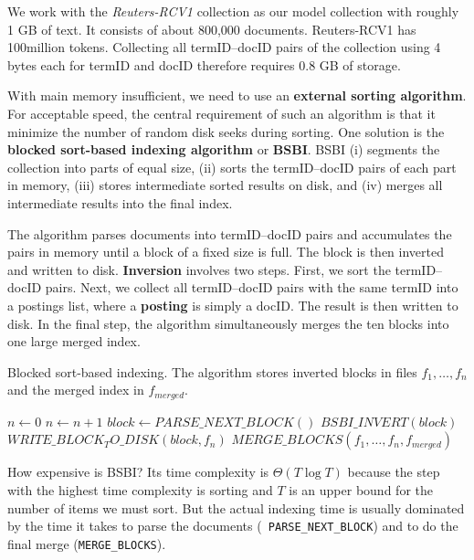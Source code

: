 \documentclass[letterpaper,11pt]{article}
\newcommand{\code}[1]{\texttt{#1}}
\begin{document}
We work with the \textit{Reuters-RCV1} collection as our model collection with roughly 1 GB of text. It consists of about 800,000 documents. Reuters-RCV1 has 100million tokens. Collecting all termID–docID pairs of
the collection using 4 bytes each for termID and docID therefore requires 0.8 GB of storage.

With main memory insufficient, we need to use an\textbf{ external sorting algorithm}. For acceptable speed, the central requirement of such an algorithm is that it minimize the number of random disk seeks during sorting. One solution is the \textbf{blocked sort-based indexing algorithm} or \textbf{BSBI}. BSBI (i) segments the collection into parts of equal size, (ii) sorts the termID–docID pairs of each part in memory, (iii) stores intermediate sorted results on disk, and (iv) merges all intermediate results into the final index.

The algorithm parses documents into termID–docID pairs and accumulates the pairs in memory until a block of a fixed size is full. The block is then inverted and written to disk. \textbf{Inversion} involves two steps. First, we sort the termID–docID pairs. Next, we collect all termID–docID pairs with the same termID into a postings list, where a \textbf{posting} is simply a docID. The result is then written to disk. In the final step, the algorithm simultaneously merges the ten blocks into one large merged index.
\begin{algorithm}[H]
\begin{algorithmic}[1]
\label{BSBINDEXCONSTRUCTION} %
\caption{Blocked sort-based indexing. The algorithm stores inverted blocks in files $f_1,\dots, f_n$ and the merged index in $f_{merged}$.}
    \State $n \gets 0$
        \State $n \gets n + 1$
        \State $block \gets PARSE\_NEXT\_BLOCK()$
        \State $BSBI\_INVERT(block)$
        \State $WRITE\_BLOCK_TO\_DISK(block,f_n)$
    \EndWhile
    \State $MERGE\_BLOCKS(f_1, \dots, f_n, f_{merged})$
\EndFunction
\end{algorithmic}
\end{algorithm}

How expensive is BSBI? Its time complexity is $\Theta(T\log T)$ because the step with the highest time complexity is sorting and $T$ is an upper bound for the number of items we must sort. But the actual indexing time is usually dominated by the time it takes to parse the documents (\code{ PARSE\_NEXT\_BLOCK}) and to do the final merge (\code{MERGE\_BLOCKS}).
\end{document}
